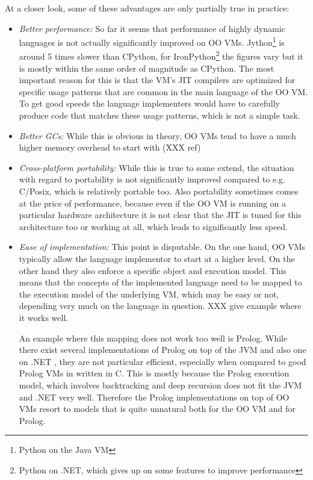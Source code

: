 \documentclass{llncs}
\begin{document}
At a closer look, some of these advantages are only partially true in practice:

\begin{itemize}
\item
\emph{Better performance:} So far it seems that performance of highly dynamic
languages is not actually significantly improved on OO VMs. 
Jython\footnote{Python on the Java VM} is around 5
times slower than CPython, for IronPython\footnote{Python on .NET, which
gives up on some features to improve performance}
the figures vary but it is mostly
within the same order of magnitude as CPython. The most important reason for
this is that the VM's JIT compilers are optimized for specific usage patterns
that are common in the main language of the OO VM. To get good speeds the
language implementers would have to carefully produce code that matches these
usage patterns, which is not a simple task.

\item
\emph{Better GCs:} While this is obvious in theory, OO VMs tend to have a much
higher memory overhead to start with (XXX ref)

\item
\emph{Cross-platform portability:} While this is true to some extend, the
situation with regard to portability is not significantly improved compared to
e.g.  C/Posix, which is relatively portable too. Also portability sometimes
comes at the price of performance, because even if the OO VM is running on a
particular hardware architecture it is not clear that the JIT is tuned for this
architecture too or working at all, which leads to significantly less
speed.

\item
\emph{Ease of implementation:} This point is disputable. On the one hand, OO
VMs typically allow the language implementor to start at a higher level. On the
other hand they also enforce a specific object and execution model. This means
that the concepts of the implemented language need to be mapped to the
execution model of the underlying VM, which may be easy or not, depending very
much on the language in question. XXX give example where it works well.

An example where this mapping does not work too well is Prolog. While there
exist several implementations of Prolog on top of the JVM \cite{prologcafe}
\cite{DBLP:conf/jelia/Calejo04} and also one on .NET \cite{psharp},
they are not particular efficient, especially when compared to good Prolog VMs
in written in C. This is mostly because the Prolog execution model, which
involves backtracking and deep recursion does not fit the JVM and .NET very
well. Therefore the Prolog implementations on top of OO VMs resort to models
that is quite unnatural both for the OO VM and for Prolog.
\end{itemize}
\end{document}
